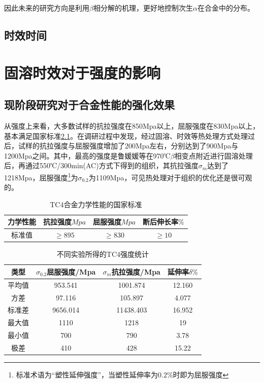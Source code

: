 \documentclass[
class = book,
zihao = -4,
font = noto,
paper = a4paper,
openany
]{easybook}
\begin{document}
因此未来的研究方向是利用$ \beta $相分解的机理，更好地控制次生$ \alpha $在合金中的分布。

\section{时效时间}
\cite{liPhaseTransformationAge2013}

\chapter{固溶时效对于强度的影响}

\section{现阶段研究对于合金性能的强化效果}
从强度上来看，大多数试样的抗拉强度在850Mpa以上，屈服强度在830Mpa以上，基本满足国家标准\ref{sec:mytc4machin}。在调研过程中发现，经过固溶、时效等热处理方式处理过后，试样的抗拉强度与屈服强度增加了200Mpa左右，分别达到了900Mpa与1200Mpa之间。其中，最高的强度是鲁媛媛等\cite{LuYuanYuanShiXiaoChuLiDuiTC4TaiHeJinWeiGuanZuZhiHeLiXueXingNengDeYingXiang2019}在970℃$ \beta $相变点附近进行固溶处理后，再通过550℃/300min(AC)方式下得到的组织，其抗拉强度$ \sigma_m $达到了1218Mpa，屈服强度\footnote{标准术语为“塑性延伸强度”，当塑性延伸率为$0.2\%  $时即为屈服强度}为$ \sigma_{0.2} $为1109Mpa，可见热处理对于组织的优化还是很可观的。
\begin{table}[htbp]
	\centering
	\caption{TC4合金力学性能的国家标准}
	\label{sec:mytc4machin}
	\begin{tabular}{cccc}
		\toprule
		力学性能& 抗拉强度$Mpa  $& 屈服强度$ Mpa $&断后伸长率$ \% $\\ \midrule
		标准值 &$ \ge 895 $&$ \ge 830 $&$ \ge 10 $ \\ \bottomrule
	\end{tabular}
\end{table}


\begin{table}[htbp]
	\centering
	\caption{不同实验所得的TC4强度统计}
	\label{sec:mytcstrengthave}
	\begin{tabular}{cccc}
		\toprule
		类型& $ \sigma_{0.2} $屈服强度/Mpa  &$ \sigma_m $抗拉强度/Mpa &延伸率$ \delta \% $ \\ \midrule
		平均值 & 953.541& 1001.874&12.160 \\
		方差 &97.116& 105.897& 4.077 \\
		标准差 &9656.014&11438.403&16.952 \\
		最大值 &  1110 & 1218 & 19 \\
		最小值&700 & 790 & 3.78 \\
		极差&410 & 428 & 15.22 \\
		\bottomrule
	\end{tabular}
\end{table}
\end{document}
